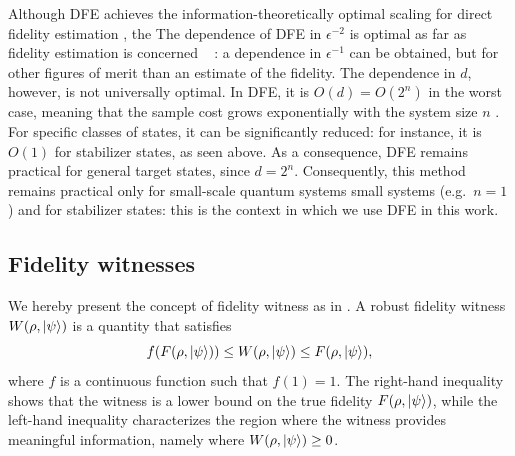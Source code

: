 \documentclass[a4paper,twocolumn,11pt,unpublished]{../../revision/quantumarticle}
\providecommand{\DIFadd}[1]{{\protect\color{blue} \sf #1}} %
\providecommand{\DIFdel}[1]{{\protect\color{red} \scriptsize #1}} %
\providecommand{\DIFaddbegin}{} %
\providecommand{\DIFaddend}{} %
\providecommand{\DIFdelbegin}{} %
\providecommand{\DIFdelend}{} %
\begin{document}
\DIFdelbegin \DIFdel{Although DFE achieves the information-theoretically optimal scaling for direct fidelity estimation , the }\DIFdelend \DIFaddbegin \DIFadd{The dependence of DFE in $\epsilon^{-2}$ is optimal as far as fidelity estimation is concerned \mbox{%
\cite{FOS24optimal}}\hskip0pt%
: a dependence in $\epsilon^{-1}$ can be obtained, but for other figures of merit than an estimate of the fidelity. The dependence in $d$, however, is not universally optimal. In DFE, it is $O(d)=O(2^n)$ in the worst case, meaning that the }\DIFaddend sample cost grows exponentially with the system size $n$\DIFaddbegin \DIFadd{. For specific classes of states, it can be significantly reduced: for instance, it is $O(1)$ for stabilizer states, as seen above. As a consequence, DFE remains practical }\DIFaddend for \DIFdelbegin \DIFdel{general target states, since $d = 2^n$. Consequently, this method remains practical only for small-scale quantum systems }\DIFdelend \DIFaddbegin \DIFadd{small systems (e.g.\ $n=1$) and for stabilizer states: this is the context in which we use DFE in this work}\DIFaddend .

\subsection{Fidelity witnesses}
\label{subsection:prelims:witness}
We hereby present the concept of fidelity witness as in \cite{CGKM21efficient, UC24efficient}. A {robust fidelity witness} $W(\rho, \ket{\psi})$ is a quantity that satisfies
\begin{equation}
\label{eq: robust fidelity witness}
    f(F(\rho, \ket{\psi}))
    \leq W(\rho, \ket{\psi}) 
    \leq F(\rho, \ket{\psi}) ,
\end{equation}
where $f$ is a continuous function such that $f(1) = 1$. 
The right-hand inequality shows that the witness is a {lower bound} on the true fidelity $F(\rho, \ket{\psi})$, while the left-hand inequality characterizes the region where the witness provides meaningful information, namely where $W(\rho, \ket{\psi}) \ge 0$.
\end{document}
